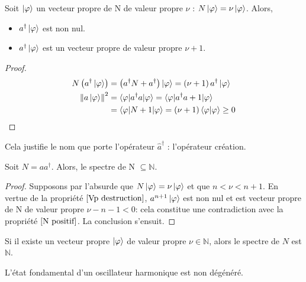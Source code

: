 \documentclass[../Notesdecours.tex]{subfiles}
\begin{document}
\begin{Property}
    Soit $\ket{\varphi}$ un vecteur propre de N de valeur propre $\nu$ : $N\ket{\varphi} = \nu\ket{\varphi}$. Alors,
    \begin{itemize}
        \item $a^\dagger\ket{\varphi}$ est non nul.
        \item $a^\dagger\ket{\varphi}$ est un vecteur propre de valeur propre $\nu+1$.
    \end{itemize}
\end{Property}
\begin{proof}
    \begin{align*}
        N \left(a^\dagger \ket{\varphi}\right) &= \left(a^\dagger N + a^\dagger\right)\ket{\varphi} = \left(\nu+1\right)a^\dagger\ket{\varphi}\\
        \norm{a\ket{\varphi}}^2 &= \braket{\varphi|a^\dagger a|\varphi} = \braket{\varphi|a^\dagger a+1|\varphi}\\
        &= \braket{\varphi|N+1|\varphi} = \left(\nu+1\right)\braket{\varphi|\varphi} \geq 0
    \end{align*}
\end{proof}

\begin{remark}
    Cela justifie le nom que porte l'opérateur $\hat{a}^\dagger$ : l'opérateur création.
\end{remark}

\begin{Property}
    Soit $N=aa^\dagger$. Alors, le spectre de N $\subseteq \mathbb{N}$.
\end{Property}
\begin{proof}
    Supposons par l'absurde que $N\ket{\varphi} = \nu\ket{\varphi}$ et que $n < \nu < n+1$. En vertue de la propriété $\ref{Vp destruction}$, $a^{n+1}\ket{\varphi}$ est non nul et est vecteur propre de N de valeur propre $\nu-n-1 < 0$: cela constitue une contradiction avec la propriété $\ref{N positif}$. La conclusion s'ensuit.
\end{proof}

\begin{corollary}
    Si il existe un vecteur propre $\ket{\varphi}$ de valeur propre $\nu\in\mathbb{N}$, alors le spectre de $N$ est $\mathbb{N}$.
\end{corollary}

\begin{Property}
    \label{Niveaux harmonique non degeneres}
    L'état fondamental d'un oscillateur harmonique est non dégénéré.
\end{Property}
\end{document}

